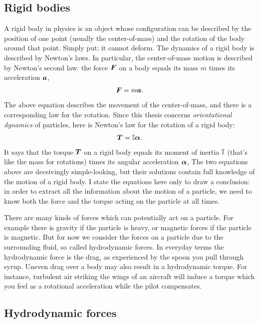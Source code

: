 \documentclass[thesis.tex]{subfiles}
\begin{document}
\subsection*{Rigid bodies}

A rigid body in physics is an object whose configuration can be described by the position of one point (usually the center-of-mass) and the rotation of the body around that point. Simply put: it cannot deform. The dynamics of a rigid body is described by Newton's laws. In particular, the center-of-mass motion is described by Newton's second law: the force $\mbox{\boldmath$F$}$ on a body equals its mass $m$ times its acceleration $\mbox{\boldmath$a$}$,
\begin{align*}
    \mbox{\boldmath$F$} = m\mbox{\boldmath$a$}.
\end{align*}
The above equation describes the movement of the center-of-mass, and there is a corresponding law for the rotation. Since this thesis concerns \emph{orientational dynamics} of particles, here is Newton's law for the rotation of a rigid body:
\begin{align*}
    \mbox{\boldmath$T$} = \mathbb{I} \mbox{\boldmath$\alpha$}.
\end{align*}
It says that the torque $\mbox{\boldmath$T$}$ on a rigid body equals its moment of inertia $\mathbb{I}$ (that's like the mass for rotations) times its angular acceleration $\mbox{\boldmath$\alpha$}$,
The two equations above are deceivingly simple-looking, but their solutions contain full knowledge of the motion of a rigid body. I state the equations here only to draw a conclusion: in order to extract all the information about the motion of a particle, we need to know both the force and the torque acting on the particle at all times.

There are many kinds of forces which can potentially act on a particle. For example there is gravity if the particle is heavy, or magnetic forces if the particle is magnetic. But for now we consider the forces on a particle due to the surrounding fluid, so called hydrodynamic forces. In everyday terms the hydrodynamic force is the drag, as experienced by the spoon you pull through syrup. Uneven drag over a body may also result in a hydrodynamic torque. For instance, turbulent air striking the wings of an aircraft will induce a torque which you feel as a rotational acceleration while the pilot compensates.

\subsection*{Hydrodynamic forces}
\end{document}
